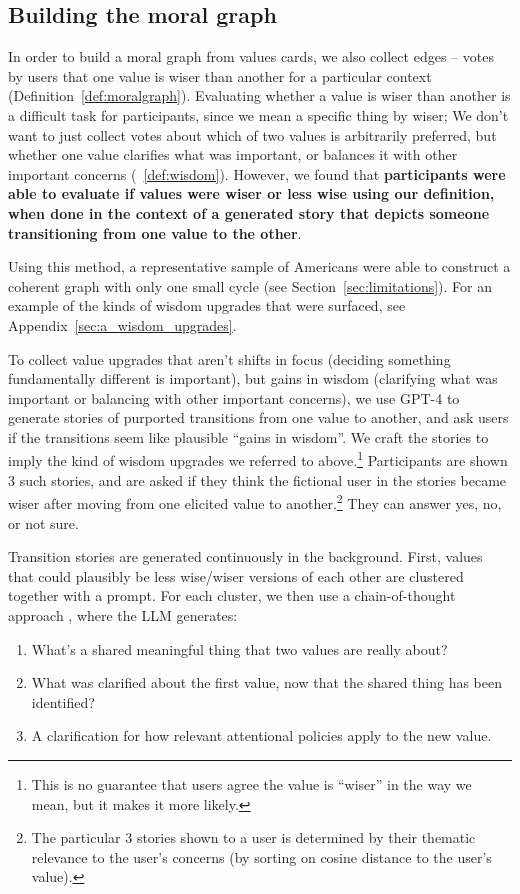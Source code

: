 \documentclass{article}
\theoremstyle{definition}
\begin{document}
\subsection{Building the moral graph}\label{sec:buildingmoralgraph}


In order to build a moral graph from values cards, we also collect edges – votes by users that one value is wiser than another for a particular context (Definition~\ref{def:moralgraph}). Evaluating whether a value is wiser than another is a difficult task for participants, since we mean a specific thing by wiser; We don't want to just collect votes about which of two values is arbitrarily preferred, but whether one value clarifies what was important, or balances it with other important concerns (~\ref{def:wisdom}). However, we found that \textbf{participants were able to evaluate if values were wiser or less wise using our definition, when done in the context of a generated story that depicts someone transitioning from one value to the other}. 

Using this method, a representative sample of Americans were able to construct a coherent graph with only one small cycle (see Section~\ref{sec:limitations}). For an example of the kinds of wisdom upgrades that were surfaced, see Appendix~\ref{sec:a_wisdom_upgrades}.

To collect value upgrades that aren't shifts in focus (deciding something fundamentally different is important), but gains in wisdom (clarifying what was important or balancing with other important concerns), we use GPT-4 to generate stories of purported transitions from one value to another, and ask users if the transitions seem like plausible “gains in wisdom”. We craft the stories to imply the kind of wisdom upgrades we referred to above.\footnote{This is no guarantee that users agree the value is “wiser” in the way we mean, but it makes it more likely.} Participants are shown 3 such stories, and are asked if they think the fictional user in the stories became wiser after moving from one elicited value to another.\footnote{The particular 3 stories shown to a user is determined by their thematic relevance to the user's concerns (by sorting on cosine distance to the user's value).} They can answer yes, no, or not sure.

Transition stories are generated continuously in the background. First, values that could plausibly be less wise/wiser versions of each other are clustered together with a prompt. For each cluster, we then use a chain-of-thought approach \citep{wei2023chainofthought}, where the LLM generates:
\begin{enumerate}
    \item What’s a shared meaningful thing that two values are really about?
\item What was clarified about the first value, now that the shared thing has been identified?
\item A clarification for how relevant attentional policies apply to the new value.
\end{enumerate}
\end{document}
